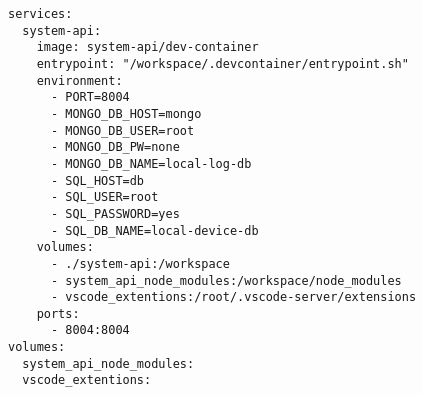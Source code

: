 
\begin{lstlisting}[language=docker-compose-2,caption={Auxiliary Services \code{docker-compose.yml}},breaklines=true,label={code::compose_service}]
services:
  system-api:
    image: system-api/dev-container
    entrypoint: "/workspace/.devcontainer/entrypoint.sh"
    environment:
      - PORT=8004
      - MONGO_DB_HOST=mongo
      - MONGO_DB_USER=root
      - MONGO_DB_PW=none
      - MONGO_DB_NAME=local-log-db
      - SQL_HOST=db
      - SQL_USER=root
      - SQL_PASSWORD=yes
      - SQL_DB_NAME=local-device-db
    volumes:
      - ./system-api:/workspace
      - system_api_node_modules:/workspace/node_modules
      - vscode_extentions:/root/.vscode-server/extensions
    ports:
      - 8004:8004
volumes:
  system_api_node_modules:
  vscode_extentions:
\end{lstlisting}

